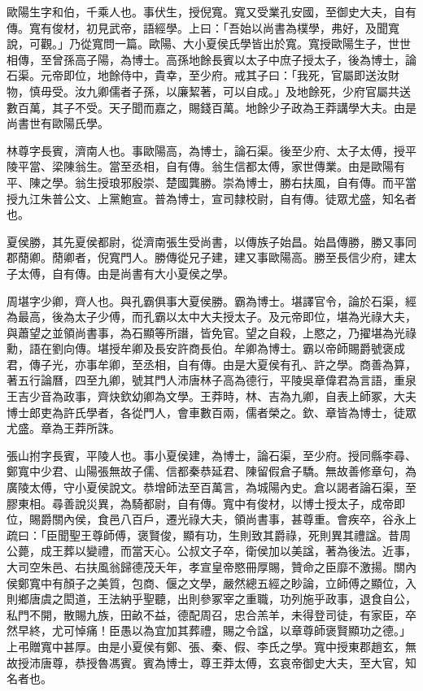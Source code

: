 \begin{pinyinscope}
歐陽生字和伯，千乘人也。事伏生，授倪寬。寬又受業孔安國，至御史大夫，自有傳。寬有俊材，初見武帝，語經學。上曰：「吾始以尚書為樸學，弗好，及聞寬說，可觀。」乃從寬問一篇。歐陽、大小夏侯氏學皆出於寬。寬授歐陽生子，世世相傳，至曾孫高子陽，為博士。高孫地餘長賓以太子中庶子授太子，後為博士，論石渠。元帝即位，地餘侍中，貴幸，至少府。戒其子曰：「我死，官屬即送汝財物，慎毋受。汝九卿儒者子孫，以廉絜著，可以自成。」及地餘死，少府官屬共送數百萬，其子不受。天子聞而嘉之，賜錢百萬。地餘少子政為王莽講學大夫。由是尚書世有歐陽氏學。

林尊字長賓，濟南人也。事歐陽高，為博士，論石渠。後至少府、太子太傅，授平陵平當、梁陳翁生。當至丞相，自有傳。翁生信都太傅，家世傳業。由是歐陽有平、陳之學。翁生授琅邪殷崇、楚國龔勝。崇為博士，勝右扶風，自有傳。而平當授九江朱普公文、上黨鮑宣。普為博士，宣司隸校尉，自有傳。徒眾尤盛，知名者也。

夏侯勝，其先夏侯都尉，從濟南張生受尚書，以傳族子始昌。始昌傳勝，勝又事同郡蕑卿。蕑卿者，倪寬門人。勝傳從兄子建，建又事歐陽高。勝至長信少府，建太子太傅，自有傳。由是尚書有大小夏侯之學。

周堪字少卿，齊人也。與孔霸俱事大夏侯勝。霸為博士。堪譯官令，論於石渠，經為最高，後為太子少傅，而孔霸以太中大夫授太子。及元帝即位，堪為光祿大夫，與蕭望之並領尚書事，為石顯等所譖，皆免官。望之自殺，上愍之，乃擢堪為光祿勳，語在劉向傳。堪授牟卿及長安許商長伯。牟卿為博士。霸以帝師賜爵號褒成君，傳子光，亦事牟卿，至丞相，自有傳。由是大夏侯有孔、許之學。商善為算，著五行論曆，四至九卿，號其門人沛唐林子高為德行，平陵吳章偉君為言語，重泉王吉少音為政事，齊炔欽幼卿為文學。王莽時，林、吉為九卿，自表上師冢，大夫博士郎吏為許氏學者，各從門人，會車數百兩，儒者榮之。欽、章皆為博士，徒眾尤盛。章為王莽所誅。

張山拊字長賓，平陵人也。事小夏侯建，為博士，論石渠，至少府。授同縣李尋、鄭寬中少君、山陽張無故子儒、信都秦恭延君、陳留假倉子驕。無故善修章句，為廣陵太傅，守小夏侯說文。恭增師法至百萬言，為城陽內史。倉以謁者論石渠，至膠東相。尋善說災異，為騎都尉，自有傳。寬中有俊材，以博士授太子，成帝即位，賜爵關內侯，食邑八百戶，遷光祿大夫，領尚書事，甚尊重。會疾卒，谷永上疏曰：「臣聞聖王尊師傅，褒賢俊，顯有功，生則致其爵祿，死則異其禮諡。昔周公薨，成王葬以變禮，而當天心。公叔文子卒，衛侯加以美諡，著為後法。近事，大司空朱邑、右扶風翁歸德茂夭年，孝宣皇帝愍冊厚賜，贊命之臣靡不激揚。關內侯鄭寬中有顏子之美質，包商、偃之文學，嚴然總五經之眇論，立師傅之顯位，入則鄉唐虞之閎道，王法納乎聖聽，出則參冢宰之重職，功列施乎政事，退食自公，私門不開，散賜九族，田畝不益，德配周召，忠合羔羊，未得登司徒，有家臣，卒然早終，尤可悼痛！臣愚以為宜加其葬禮，賜之令諡，以章尊師褒賢顯功之德。」上弔贈寬中甚厚。由是小夏侯有鄭、張、秦、假、李氏之學。寬中授東郡趙玄，無故授沛唐尊，恭授魯馮賓。賓為博士，尊王莽太傅，玄哀帝御史大夫，至大官，知名者也。


\end{pinyinscope}
